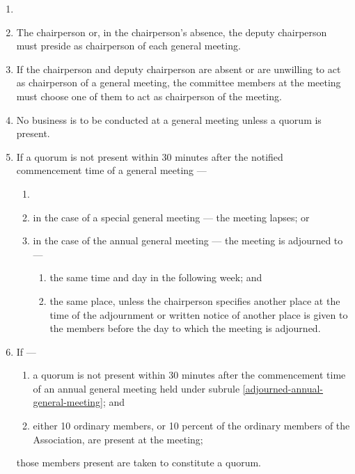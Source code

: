 \documentclass[../constitution.tex]{subfiles}
\begin{document}
\begin{enumerate}

\item 
\item The chairperson or, in the chairperson's absence, the deputy chairperson must preside as chairperson of each general meeting.
\item If the chairperson and deputy chairperson are absent or are unwilling to act as chairperson of a general meeting, the committee members at the meeting must choose one of them to act as chairperson of the meeting.
\item No business is to be conducted at a general meeting unless a quorum is present.
\item If a quorum is not present within 30 minutes after the notified commencement time of a general meeting ---

  \begin{enumerate}
  
  \item 
  \item in the case of a special general meeting --- the meeting lapses; or
  \item in the case of the annual general meeting --- the meeting is adjourned to --- \label{adjourned-annual-general-meeting}

    \begin{enumerate}
    
    \item the same time and day in the following week; and
    \item the same place, unless the chairperson specifies another place at the time of the adjournment or written notice of another place is given to the members before the day to which the meeting is adjourned.
    \end{enumerate}
  \end{enumerate}
\item If ---

  \begin{enumerate}
  
  \item a quorum is not present within 30 minutes after the commencement time of an annual general meeting held under subrule \ref{adjourned-annual-general-meeting}; and
  \item either 10 ordinary members, or 10 percent of the ordinary members of the Association, are present at the meeting;
  \end{enumerate}
  those members present are taken to constitute a quorum.
\end{enumerate}
\end{document}
